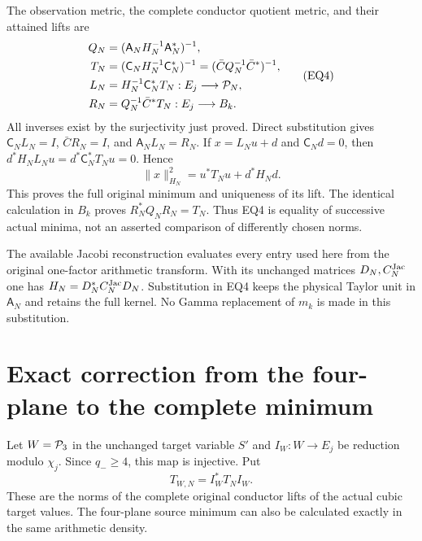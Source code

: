 The observation metric, the complete conductor quotient metric, and
their attained lifts are
\[
 \begin{split}
 Q_N&=(\mathsf A_NH_N^{-1}\mathsf A_N^*)^{-1},\\
 T_N&=(\mathsf C_NH_N^{-1}\mathsf C_N^*)^{-1}
       =(\bar C Q_N^{-1}\bar C^*)^{-1},\\
 L_N&=H_N^{-1}\mathsf C_N^*T_N:E_j\longrightarrow\mathcal P_N,\\
 R_N&=Q_N^{-1}\bar C^*T_N:E_j\longrightarrow B_k.
 \end{split}                                                       \tag{EQ4}
\]
All inverses exist by the surjectivity just proved. Direct substitution
gives $\mathsf C_NL_N=I$, $\bar CR_N=I$, and
$\mathsf A_NL_N=R_N$. If $x=L_Nu+d$ and $\mathsf C_Nd=0$, then
$d^*H_NL_Nu=d^*\mathsf C_N^*T_Nu=0$. Hence
\[
 \|x\|_{H_N}^2=u^*T_Nu+d^*H_Nd.                                  \tag{EQ5}
\]
This proves the full original minimum and uniqueness of its lift.
The identical calculation in $B_k$ proves
$R_N^*Q_NR_N=T_N$. Thus EQ4 is equality of successive actual
minima, not an asserted comparison of differently chosen norms.

The available Jacobi reconstruction \cite{eightmin:JC} evaluates every entry
used here from the original one-factor arithmetic transform. With its
unchanged matrices $D_N,C_N^{\rm Jac}$ one has
$H_N=D_N^*C_N^{\rm Jac}D_N$. Substitution in EQ4 keeps the physical
Taylor unit in $\mathsf A_N$ and retains the full kernel. No Gamma
replacement of $m_k$ is made in this substitution.

\section{Exact correction from the four-plane to the complete minimum}
Let $W=\mathcal P_3$ in the unchanged target variable $S'$ and
$I_W:W\to E_j$ be reduction modulo $\chi_j$. Since $q_-\ge4$,
this map is injective. Put
\[
 T_{W,N}=I_W^*T_NI_W.                                               \tag{EQ6}
\]
These are the norms of the complete original conductor lifts of
the actual cubic target values. The four-plane source minimum can
also be calculated exactly in the same arithmetic density.

